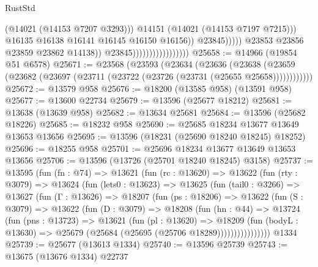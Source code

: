 \begin{lexlean}{RustStd}
\begin{coremodule}
                                                            (@14021 (@14153 @7207 @3293)))
                                                          @14151
                                                          (@14021 (@14153 @7197 @7215)))
                                                        @16135
                                                        @16138
                                                        @16141
                                                        @16145
                                                        @16150
                                                        @16156))
                                                    @23845)))))
                                          @23853
                                          @23856
                                          @23859
                                          @23862
                                          @14138))
                                      @23845)))))))))))))))))
@25658 := @14966 (@19854 @51 @6578)
@25671 := @23568
    (@23593
      (@23634
        (@23636
          (@23638 (@23659 (@23682 (@23697 (@23711 (@23722 (@23726 (@23731 (@25655 @25658))))))))))))
@25672 := @13579 @958
@25676 := @18200 (@13585 @958) (@13591 @958)
@25677 := @13600 @22734
@25679 := @13596 (@25677 @18212)
@25681 := @13638 (@13639 @958)
@25682 := @13634 @25681
@25684 := @13596 (@25682 @18226)
@25685 := @18232 @958
@25690 := @25685 @18234 @13677 @13649 @13653 @13656
@25695 := @13596 (@18231 (@25690 @18240 @18245) @18252)
@25696 := @18255 @958
@25701 := @25696 @18234 @13677 @13649 @13653 @13656
@25706 := @13596 (@13726 (@25701 @18240 @18245) @3158)
@25737 := @13595
    (fun (fn : @74) =>
    @13621
      (fun (rc : @13620) =>
      @13622
        (fun (rty : @3079) =>
        @13624
          (fun (lets0 : @13623) =>
          @13625
            (fun (tail0 : @3266) =>
            @13627
              (fun (Γ : @13626) =>
              @18207
                (fun (ps : @18206) =>
                @13622
                  (fun (S : @3079) =>
                  @13622
                    (fun (D : @3079) =>
                    @18208
                      (fun (hn : @44) =>
                      @13724
                        (fun (pns : @13723) =>
                        @13621
                          (fun (pl : @13620) =>
                          @18209
                            (fun (bodyL : @13630) =>
                            @25679 (@25684 (@25695 (@25706 @18289))))))))))))))))
    @1334
@25739 := @25677 (@13613 @1334)
@25740 := @13596 @25739
@25743 := @13675 (@13676 @1334) @22737

\end{coremodule}
\end{lexlean}

